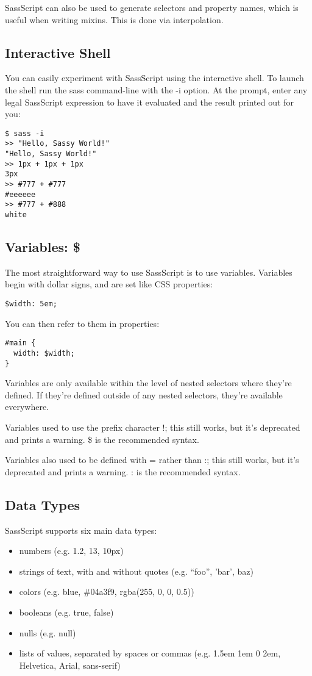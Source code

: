 \documentclass[9pt]{article}
\begin{document}
 SassScript can also be used to generate selectors and property names, which is useful when writing mixins. This is done via interpolation.
\subsection{Interactive Shell}


 You can easily experiment with SassScript using the interactive shell. To launch the shell run the sass command-line with the -i option. At the prompt, enter any legal SassScript expression to have it evaluated and the result printed out for you:
\begin{verbatim}
$ sass -i
>> "Hello, Sassy World!"
"Hello, Sassy World!"
>> 1px + 1px + 1px
3px
>> #777 + #777
#eeeeee
>> #777 + #888
white
\end{verbatim}
\subsection{Variables: \$}


 The most straightforward way to use SassScript is to use variables. Variables begin with dollar signs, and are set like CSS properties:
\begin{verbatim}
$width: 5em;
\end{verbatim}


 You can then refer to them in properties:
\begin{verbatim}
#main {
  width: $width;
}
\end{verbatim}


 Variables are only available within the level of nested selectors where they’re defined. If they’re defined outside of any nested selectors, they’re available everywhere.


 Variables used to use the prefix character !; this still works, but it’s deprecated and prints a warning. \$ is the recommended syntax.


 Variables also used to be defined with = rather than :; this still works, but it’s deprecated and prints a warning. : is the recommended syntax.
\subsection{Data Types}


 SassScript supports six main data types:
\begin{itemize}
\item numbers (e.g. 1.2, 13, 10px)
\item strings of text, with and without quotes (e.g. ``foo'', 'bar', baz)
\item colors (e.g. blue, \#04a3f9, rgba(255, 0, 0, 0.5))
\item booleans (e.g. true, false)
\item nulls (e.g. null)
\item lists of values, separated by spaces or commas (e.g. 1.5em 1em 0 2em, Helvetica, Arial, sans-serif)

\end{itemize}
\end{document}
